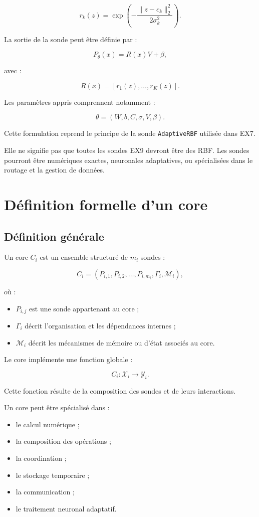 \documentclass[11pt,a4paper]{article}
\begin{document}
\[
r_k(z)
=
\exp\left(
-\frac{\|z-c_k\|_2^2}{2\sigma_k^2}
\right).
\]

La sortie de la sonde peut être définie par :

\[
P_{\theta}(x)
=
R(x)V+\beta,
\]

avec :

\[
R(x)=[r_1(z),\ldots,r_K(z)].
\]

Les paramètres appris comprennent notamment :

\[
\theta=(W,b,C,\sigma,V,\beta).
\]

Cette formulation reprend le principe de la sonde
\texttt{AdaptiveRBF} utilisée dans EX7.

Elle ne signifie pas que toutes les sondes EX9 devront être des RBF.
Les sondes pourront être numériques exactes, neuronales adaptatives,
ou spécialisées dans le routage et la gestion de données.

\section{Définition formelle d'un core}

\subsection{Définition générale}

Un core $C_i$ est un ensemble structuré de $m_i$ sondes :

\[
C_i =
\left(
P_{i,1},
P_{i,2},
\ldots,
P_{i,m_i},
\Gamma_i,
\mathcal{M}_i
\right),
\]

où :

\begin{itemize}
  \item $P_{i,j}$ est une sonde appartenant au core ;
  \item $\Gamma_i$ décrit l'organisation et les dépendances internes ;
  \item $\mathcal{M}_i$ décrit les mécanismes de mémoire ou d'état
        associés au core.
\end{itemize}

Le core implémente une fonction globale :

\[
C_i : \mathcal{X}_i \rightarrow \mathcal{Y}_i.
\]

Cette fonction résulte de la composition des sondes et de leurs
interactions.

Un core peut être spécialisé dans :
\begin{itemize}
  \item le calcul numérique ;
  \item la composition des opérations ;
  \item la coordination ;
  \item le stockage temporaire ;
  \item la communication ;
  \item le traitement neuronal adaptatif.
\end{itemize}
\end{document}
